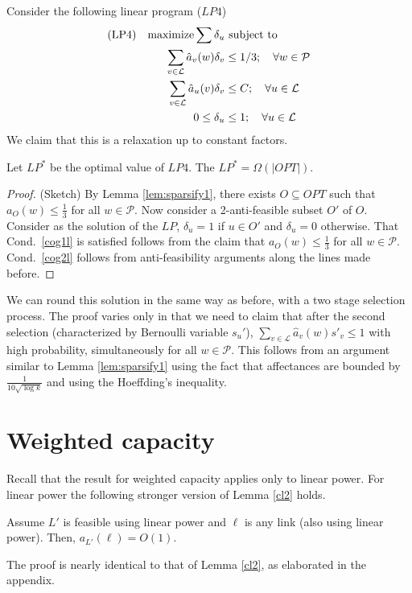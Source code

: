 \documentclass[11pt]{amsart}
\def\calL{{\mathcal L}}
\def\calP{{\mathcal P}}
\begin{document}
Consider the following linear program ($LP4$)
\begin{align}
\text{(LP4)\quad maximize} \sum \delta_u & \text{ subject to} \nonumber\\
\sum_{v \in \calL} \hat{a}_v(w) \delta_v & \leq 1/3; \quad \forall w \in \calP \label{cog1l} \\
\sum_{v \in \calL} \hat{a}_u(v) \delta_v & \leq C; \quad \forall u \in \calL \label{cog2l} \\
0 \leq \delta_u & \leq 1; \quad \forall u \in \calL \nonumber
\end{align}
We claim that this is a relaxation up to constant factors.
\begin{lemma}
Let $LP^*$ be the optimal value of $LP4$. The $LP^* = \Omega(|OPT|)$.
\end{lemma}
\begin{proof}{(Sketch)}
By Lemma \ref{lem:sparsify1}, there exists  $O \subseteq OPT$ such that $a_O(w) \leq \frac{1}{3}$ for all $w \in \calP$. Now consider
a 2-anti-feasible subset $O'$ of $O$. Consider as the solution of the
$LP$, $\delta_u = 1$ if $u \in O'$ and $\delta_u = 0$
otherwise. That Cond.\ \ref{cog1l} is satisfied follows from the claim
that $a_O(w) \leq 
\frac{1}{3}$ for all $w \in \calP$. Cond.\ \ref{cog2l} follows from anti-feasibility arguments along the lines made before.
\end{proof}


We can round this solution in the same way as before, with a two stage selection process. The proof varies only in that we need to claim that after the second
selection (characterized by Bernoulli variable $s_u'$), $\sum_{v \in \calL} \hat{a}_v(w) s'_v \leq 1$ with high probability, simultaneously for all $w \in \calP$.
This  follows from an argument similar to Lemma \ref{lem:sparsify1} using the fact that affectances are bounded by $\frac{1}{10 \sqrt{\log k}}$ and using the Hoeffding's inequality.


\section{Weighted capacity}
\label{sec:weighted}
Recall that the result for weighted capacity applies only to linear power. For linear power the following stronger version of Lemma \ref{cl2} holds.

\begin{lemma}
Assume $L'$ is feasible using linear power and $\ell$ is any link (also using linear power). Then, $a_{L'}(\ell) = O(1)$.
\label{cl4}
\end{lemma}
The proof is nearly identical to that of Lemma \ref{cl2}, as elaborated
in the appendix.
\end{document}
